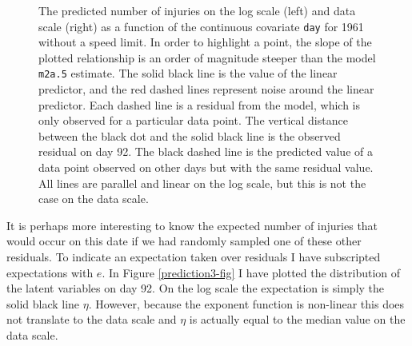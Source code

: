\documentclass{article}
\begin{document}
\begin{figure}
\begin{minipage}[b]{0.5\linewidth}
\end{minipage}
\caption{The predicted number of injuries on the log scale (left) and data scale (right) as a function of the continuous covariate \texttt{day} for 1961 without a speed limit. In order to highlight a point, the slope of the plotted relationship is an order of magnitude steeper than the model \texttt{m2a.5} estimate.  The solid black line is the value of the linear predictor, and the red dashed lines represent noise around the linear predictor. Each dashed line is a residual from the model, which is only observed for a particular data point. The vertical distance between the black dot and the solid black line is the observed residual on day 92. The black dashed line is the predicted value of a data point observed on other days but with the same residual value.  All lines are parallel and linear on the log scale, but this is not the case on the data scale.
}
\label{prediction1-fig}
\end{figure}


It is perhaps more interesting to know the expected number of injuries that would occur on this date if we had randomly sampled one of these other residuals. To indicate an expectation taken over residuals I have subscripted expectations with $e$.  In Figure \ref{prediction3-fig}  I have plotted the distribution of the latent variables on day 92. On the log scale the expectation is simply the solid black line $\eta$. However, because the exponent function is non-linear this does not translate to the data scale and $\eta$ is actually equal to the median value on the data scale.\\ 


\iftalk
\else
\fi

\iftalk
\else
\fi
\end{document}
